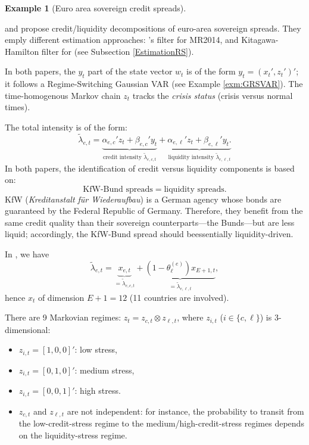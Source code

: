 \documentclass[
  12pt,
]{book}
\providecommand{\tightlist}{%
  \setlength{\itemsep}{0pt}\setlength{\parskip}{0pt}}
\theoremstyle{definition}
\theoremstyle{definition}
\newtheorem{example}{Example}[chapter]
\theoremstyle{definition}
\theoremstyle{definition}
\theoremstyle{remark}
\begin{document}
\begin{example}[Euro area sovereign credit spreads]
\protect\hypertarget{exm:SovereignSpreads}{}\label{exm:SovereignSpreads}

\citet{Monfort_Renne_NER2011} and \citet{Monfort_Renne_2014} propose credit/liquidity decompositions of euro-area sovereign spreads. They emply different estimation approaches: \citet{Kim_1994}'s filter for MR2014, and Kitagawa-Hamilton filter for \citet{Monfort_Renne_NER2011} (see Subsection \ref{EstimationRS}).

In both papers, the \(y_t\) part of the state vector \(w_t\) is of the form \(y_t = (x_t',z_t')'\); it follows a Regime-Switching Gaussian VAR (see Example \ref{exm:GRSVAR}). The time-homogenous Markov chain \(z_t\) tracks the \emph{crisis status} (crisis versus normal times).

The total intensity is of the form:
\[
\widetilde{\lambda}_{e,t} = \underbrace{\alpha_{e,c}'z_t + \beta_{e,c}'y_t}_{\mbox{credit intensity $\widetilde{\lambda}_{e,c,t}$}} + \underbrace{\alpha_{e,\ell}'z_t + \beta_{e,\ell}'y_t.}_{\mbox{liquidity intensity $\widetilde{\lambda}_{e,\ell,t}$}}
\]
In both papers, the identification of credit versus liquidity components is based on:
\[
\mbox{KfW-Bund spreads} =  \mbox{liquidity spreads}.
\]
KfW (\emph{Kreditanstalt für Wiederaufbau}) is a German agency whose bonds are guaranteed by the Federal Republic of Germany. Therefore, they benefit from the same credit quality than their sovereign counterparts---the Bunds---but are less liquid; accordingly, the KfW-Bund spread should beessentially liquidity-driven.

In \citet{Monfort_Renne_2014}, we have
\[
\widetilde{\lambda}_{e,t} = \underbrace{x_{e,t}}_{=\widetilde{\lambda}_{e,c,t}} + \underbrace{(1-\theta^{(e)}_\ell)x_{E+1,t}}_{=\widetilde{\lambda}_{e,\ell,t}},
\]
hence \(x_t\) of dimension \(E+1 = 12\) (11 countries are involved).

There are 9 Markovian regimes: \(z_t = z_{c,t} \otimes z_{\ell,t}\), where \(z_{i,t}\) (\(i \in \{c,\ell\}\)) is 3-dimensional:

\begin{itemize}
\tightlist
\item
  \(z_{i,t}=[1,0,0]'\): low stress,
\item
  \(z_{i,t}=[0,1,0]'\): medium stress,
\item
  \(z_{i,t}=[0,0,1]'\): high stress.
\item
  \(z_{c,t}\) and \(z_{\ell,t}\) are not independent: for instance, the probability to transit from the low-credit-stress regime to the medium/high-credit-stress regimes depends on the liquidity-stress regime.
\end{itemize}


\end{example}
\end{document}
